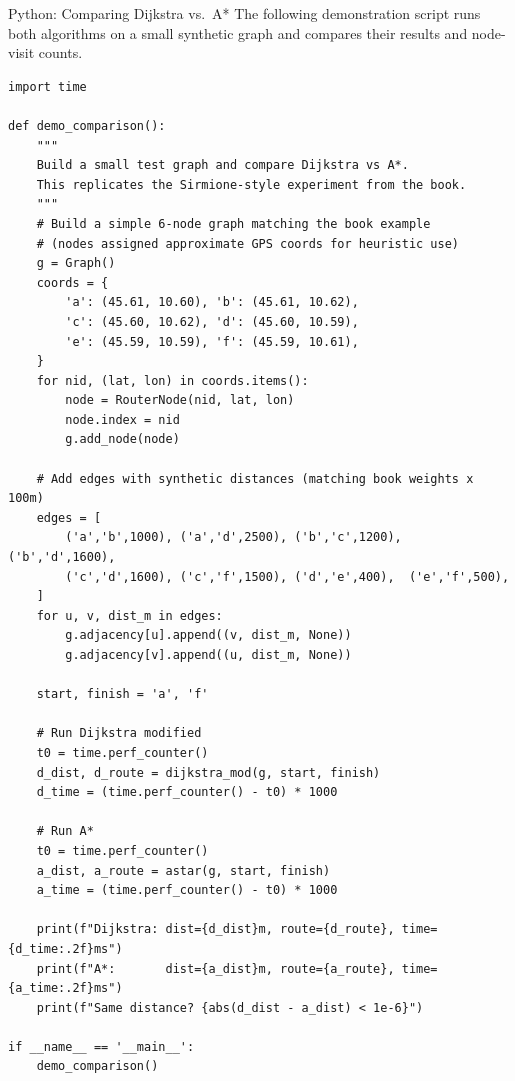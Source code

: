 \documentclass[aspectratio=169,10pt]{beamer}
\begin{document}
\begin{frame}[fragile]{Python: Comparing Dijkstra vs.\ A*}
  The following demonstration script runs both algorithms on a small
  synthetic graph and compares their results and node-visit counts.

\begin{lstlisting}[style=pythoncode]
import time

def demo_comparison():
    """
    Build a small test graph and compare Dijkstra vs A*.
    This replicates the Sirmione-style experiment from the book.
    """
    # Build a simple 6-node graph matching the book example
    # (nodes assigned approximate GPS coords for heuristic use)
    g = Graph()
    coords = {
        'a': (45.61, 10.60), 'b': (45.61, 10.62),
        'c': (45.60, 10.62), 'd': (45.60, 10.59),
        'e': (45.59, 10.59), 'f': (45.59, 10.61),
    }
    for nid, (lat, lon) in coords.items():
        node = RouterNode(nid, lat, lon)
        node.index = nid
        g.add_node(node)

    # Add edges with synthetic distances (matching book weights x 100m)
    edges = [
        ('a','b',1000), ('a','d',2500), ('b','c',1200), ('b','d',1600),
        ('c','d',1600), ('c','f',1500), ('d','e',400),  ('e','f',500),
    ]
    for u, v, dist_m in edges:
        g.adjacency[u].append((v, dist_m, None))
        g.adjacency[v].append((u, dist_m, None))

    start, finish = 'a', 'f'

    # Run Dijkstra modified
    t0 = time.perf_counter()
    d_dist, d_route = dijkstra_mod(g, start, finish)
    d_time = (time.perf_counter() - t0) * 1000

    # Run A*
    t0 = time.perf_counter()
    a_dist, a_route = astar(g, start, finish)
    a_time = (time.perf_counter() - t0) * 1000

    print(f"Dijkstra: dist={d_dist}m, route={d_route}, time={d_time:.2f}ms")
    print(f"A*:       dist={a_dist}m, route={a_route}, time={a_time:.2f}ms")
    print(f"Same distance? {abs(d_dist - a_dist) < 1e-6}")

if __name__ == '__main__':
    demo_comparison()
\end{lstlisting}
\end{frame}
\end{document}
